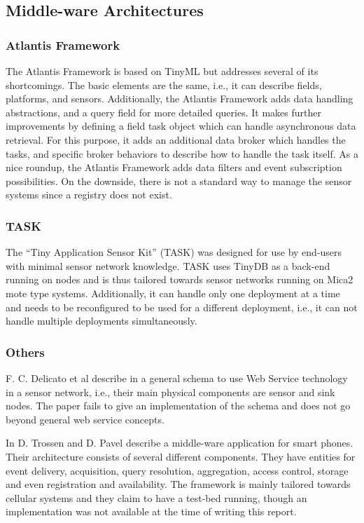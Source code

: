 \subsection{Middle-ware Architectures}
\subsubsection{Atlantis Framework}
The Atlantis Framework \cite{arnaudov2005umh} is based on TinyML but
addresses several of its shortcomings. The basic elements are the same, i.e.,
it can describe fields, platforms, and sensors. Additionally, the
Atlantis Framework adds data handling abstractions, and a query field
for more detailed queries. It makes further improvements by
defining a field task object which can handle asynchronous data
retrieval. For this purpose, it adds an additional data broker which
handles the tasks, and specific broker behaviors to describe how to handle 
the task itself. As a nice roundup, the Atlantis
Framework adds data filters and event subscription possibilities.  On the downside,
there is not a standard way to manage the sensor systems since a registry does not
exist.

\subsubsection{TASK}
The ``Tiny Application Sensor Kit'' (TASK) \cite{buonadonna2005tsn}
was designed for use by end-users with minimal sensor network
knowledge. TASK uses TinyDB as a back-end running on nodes and is thus
tailored towards sensor networks running on Mica2 mote
type systems. Additionally, it can handle only one deployment at a time and
needs to be reconfigured to be used for a different deployment, i.e.,
it can not handle multiple deployments simultaneously.

\subsubsection{Others}
F. C. Delicato et al describe in \cite{delicato2003fws} a general
schema to use Web Service technology in a sensor network, i.e., their
main physical components are sensor and sink nodes. The paper fails to
give an implementation of the schema and does not go beyond general web
service concepts.

In \cite{trossen2005bup} D. Trossen and D. Pavel describe a
middle-ware application for smart phones. Their architecture consists
of several different components. They have entities for event
delivery, acquisition, query resolution, aggregation, access control,
storage and even registration and availability. The framework is
mainly tailored towards cellular systems and they claim to have a
test-bed running, though an implementation was not available at the
time of writing this report.

